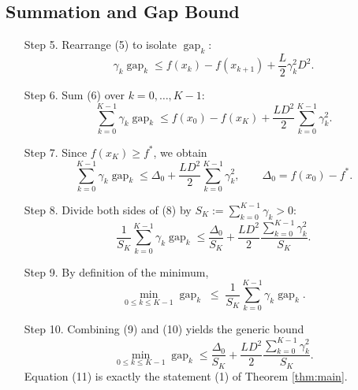 \documentclass{article}
\newcommand{\gap}{\operatorname{gap}}
\begin{document}
\subsection*{Summation and Gap Bound}
\begin{enumerate}
\item[Step 5.] Rearrange (5) to isolate $\gap_{k}$:
\[
\gamma_{k}\gap_{k}\le f(x_{k})-f(x_{k+1})+\frac{L}{2}\gamma_{k}^{2}D^{2}.
\tag{6}
\]

\item[Step 6.] Sum (6) over $k=0,\dots,K-1$:
\[
\sum_{k=0}^{K-1}\gamma_{k}\gap_{k}
\le f(x_{0})-f(x_{K})+\frac{L D^{2}}{2}\sum_{k=0}^{K-1}\gamma_{k}^{2}.
\tag{7}
\]

\item[Step 7.] Since $f(x_{K})\ge f^{*}$, we obtain
\[
\sum_{k=0}^{K-1}\gamma_{k}\gap_{k}
\le \Delta_{0}+\frac{L D^{2}}{2}\sum_{k=0}^{K-1}\gamma_{k}^{2},
\qquad
\Delta_{0}=f(x_{0})-f^{*}.
\tag{8}
\]

\item[Step 8.] Divide both sides of (8) by $S_{K}:=\sum_{k=0}^{K-1}\gamma_{k}>0$:
\[
\frac{1}{S_{K}}\sum_{k=0}^{K-1}\gamma_{k}\gap_{k}
\le \frac{\Delta_{0}}{S_{K}}+\frac{L D^{2}}{2}\frac{\sum_{k=0}^{K-1}\gamma_{k}^{2}}{S_{K}}.
\tag{9}
\]

\item[Step 9.] By definition of the minimum,
\[
\min_{0\le k\le K-1}\gap_{k}
\;\le\;
\frac{1}{S_{K}}\sum_{k=0}^{K-1}\gamma_{k}\gap_{k}.
\tag{10}
\]

\item[Step 10.] Combining (9) and (10) yields the generic bound
\[
\min_{0\le k\le K-1}\gap_{k}
\le
\frac{\Delta_{0}}{S_{K}}
+\frac{L D^{2}}{2}\frac{\sum_{k=0}^{K-1}\gamma_{k}^{2}}{S_{K}}.
\tag{11}
\]
Equation (11) is exactly the statement (1) of Theorem \ref{thm:main}.
\end{enumerate}
\end{document}
